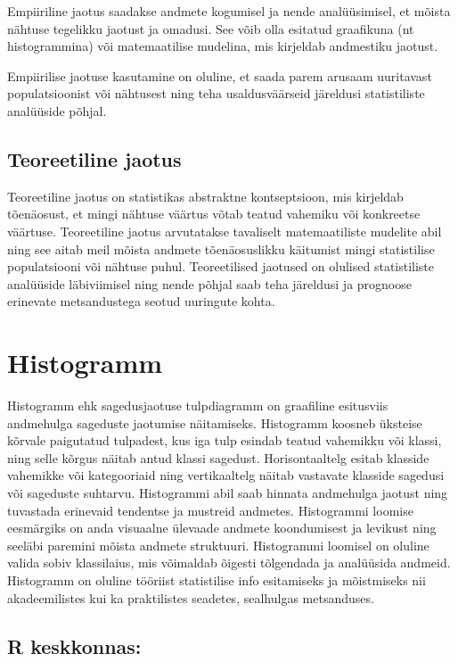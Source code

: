 \documentclass[
]{book}
\begin{document}
Empiiriline jaotus saadakse andmete kogumisel ja nende analüüsimisel, et mõista nähtuse tegelikku jaotust ja omadusi. See võib olla esitatud graafikuna (nt histogrammina) või matemaatilise mudelina, mis kirjeldab andmestiku jaotust.

Empiirilise jaotuse kasutamine on oluline, et saada parem arusaam uuritavast populatsioonist või nähtusest ning teha usaldusväärseid järeldusi statistiliste analüüside põhjal.

\subsection{Teoreetiline jaotus}\label{teoreetiline-jaotus}

Teoreetiline jaotus on statistikas abstraktne kontseptsioon, mis kirjeldab tõenäosust, et mingi nähtuse väärtus võtab teatud vahemiku või konkreetse väärtuse. Teoreetiline jaotus arvutatakse tavaliselt matemaatiliste mudelite abil ning see aitab meil mõista andmete tõenäosuslikku käitumist mingi statistilise populatsiooni või nähtuse puhul. Teoreetilised jaotused on olulised statistiliste analüüside läbiviimisel ning nende põhjal saab teha järeldusi ja prognoose erinevate metsandustega seotud uuringute kohta.

\section{Histogramm}\label{histogramm}

Histogramm ehk sagedusjaotuse tulpdiagramm on graafiline esitusviis andmehulga sageduste jaotumise näitamiseks. Histogramm koosneb üksteise kõrvale paigutatud tulpadest, kus iga tulp esindab teatud vahemikku või klassi, ning selle kõrgus näitab antud klassi sagedust. Horisontaaltelg esitab klasside vahemikke või kategooriaid ning vertikaaltelg näitab vastavate klasside sagedusi või sageduste suhtarvu. Histogrammi abil saab hinnata andmehulga jaotust ning tuvastada erinevaid tendentse ja mustreid andmetes. Histogrammi loomise eesmärgiks on anda visuaalne ülevaade andmete koondumisest ja levikust ning seeläbi paremini mõista andmete struktuuri. Histogrammi loomisel on oluline valida sobiv klassilaius, mis võimaldab õigesti tõlgendada ja analüüsida andmeid. Histogramm on oluline tööriist statistilise info esitamiseks ja mõistmiseks nii akadeemilistes kui ka praktilistes seadetes, sealhulgas metsanduses.

\subsection{R keskkonnas:}\label{r-keskkonnas}
\end{document}
